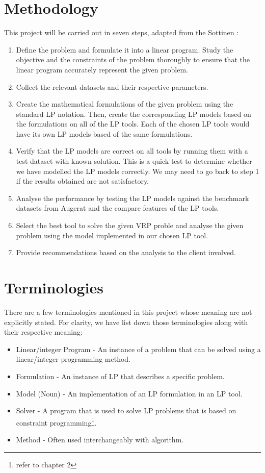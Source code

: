 \section{Methodology}
This project will be carried out in seven steps, adapted from the Sottinen \cite{Sottinen2009}:
\begin{enumerate}
\item Define the problem and formulate it into a linear program. Study the objective and the constraints of the problem thoroughly to ensure
that the linear program accurately represent the given problem.
\item Collect the relevant datasets and their respective parameters.
\item Create the mathematical formulations of the given problem using the standard LP notation.
Then, create the corresponding LP models based on the formulations on all of the LP tools. Each of the chosen LP tools would
have its own LP models based of the same formulations.
\item Verify that the LP models are correct on all tools by running them with a test dataset with known solution. This is a quick test
to determine whether we have modelled the LP models correctly. We may need to go back to step 1 if the results obtained
are not satisfactory.
\item Analyse the performance by testing the LP models
 against the benchmark datasets from Augerat \cite{Augerat1998} and the compare features of the LP tools.
\item Select the best tool to solve the given VRP proble and analyse the given problem using the model implemented in our chosen LP tool.
\item Provide recommendations based on the analysis to the client involved.
\end{enumerate}

\section{Terminologies}
There are a few terminologies mentioned in this project whose meaning are not explicitly stated.
For clarity, we have list down those terminologies along with their respective meaning:
\begin{itemize}
\item Linear/integer Program - An instance of a problem that can be solved using a linear/integer programming method.
\item Formulation - An instance of LP that describes a specific problem.
\item Model (Noun) - An implementation of an LP formulation in an LP tool.
\item Solver - A program that is used to solve LP problems that is based on constraint programming\footnote{refer to chapter 2}.
\item Method - Often used interchangeably with algorithm.
\end{itemize}

